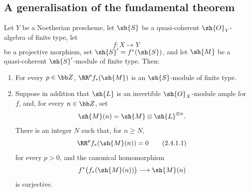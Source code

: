 \subsection{A generalisation of the fundamental theorem}
\label{subsection:III.2.4}

\begin{theorem}[2.4.1]
\label{III.2.4.1}
Let $Y$ be a Noetherian prescheme, let $\sh{S}$ be a quasi-coherent $\sh{O}_Y$-algebra of finite type, let
\[
  f:X\longrightarrow Y
\]
be a projective morphism, set $\sh{S}'=f^*(\sh{S})$, and let $\sh{M}$ be a quasi-coherent $\sh{S}'$-module of finite type.
Then:
\begin{enumerate}
  \item[(i)] For every $p\in\bb Z$, $\RR^p f_*(\sh{M})$ is an $\sh{S}$-module of finite type.

  \item[(ii)] Suppose in addition that $\sh{L}$ is an invertible $\sh{O}_X$-module ample for $f$, and, for every $n\in\bb Z$, set
  \[
    \sh{M}(n)=\sh{M}\otimes\sh{L}^{\otimes n}.
  \]
  There is an integer $N$ such that, for $n\geq N$,
  \[
  \label{III.2.4.1.1}
    \RR^p f_*(\sh{M}(n))=0
    \tag{2.4.1.1}
  \]
  for every $p>0$, and the canonical homomorphism
  \[
    f^*\bigl(f_*(\sh{M}(n))\bigr)\longrightarrow\sh{M}(n)
  \]
   is surjective.
\end{enumerate}
\end{theorem}

